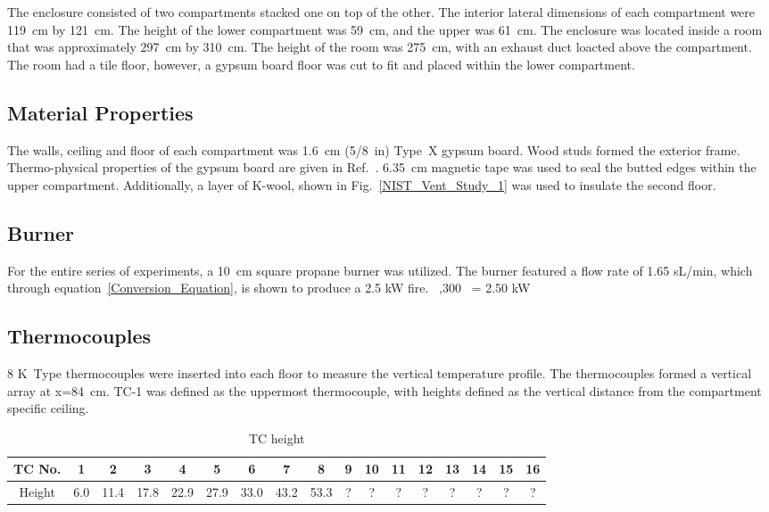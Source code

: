The enclosure consisted of two compartments stacked one on top of the other. The interior lateral dimensions of each compartment were 119~cm by 121~cm. The height of the lower compartment was 59~cm, and the upper was 61~cm. The enclosure was located inside a room that was approximately 297~cm by 310~cm. The height of the room was 275~cm, with an exhaust duct loacted above the compartment. The room had a tile floor, however, a gypsum board floor was cut to fit and placed within the lower compartment. 

\subsection{Material Properties}

The walls, ceiling and floor of each compartment was 1.6~cm (5/8~in) Type~X gypsum board. Wood studs formed the exterior frame. Thermo-physical properties of the gypsum board are given in Ref.~\cite{Manzello:SiF08}. 6.35~cm magnetic tape was used to seal the butted edges within the upper compartment. Additionally, a  layer of K-wool, shown in Fig.~\ref{NIST_Vent_Study_1} was used to insulate the second floor.

\subsection{Burner}

For the entire series of experiments, a 10~cm square propane burner was utilized. The burner featured a flow rate of 1.65 sL/min, which through equation~\ref{Conversion_Equation}, is shown to produce a 2.5 kW fire.
  \times {}  \times {}   \,  ,300 \,  = 2.50 \; {\rm kW}
\label{Conversion_Equation}
\ee

\subsection{Thermocouples}
8 K~Type thermocouples were inserted into each floor to measure the vertical temperature profile. The thermocouples formed a vertical array at x=84~cm. TC-1 was defined as the uppermost thermocouple, with heights defined as the vertical distance from the compartment specific ceiling.

\begin{table}[h!]
\caption{TC height}
\begin{center}
\begin{tabular}{|c|c|c|c|c|c|c|c|c|c|c|c|c|c|c|c|c|}
\hline
TC No.& 1& 2& 3 & 4& 5& 6& 7& 8& 9&10&11&12&13&14&15&16\\ \hline
Height& 6.0& 11.4& 17.8& 22.9& 27.9& 33.0& 43.2& 53.3& ?& ?& ?& ?& ?& ?&?&?\\ \hline
\end{tabular}
\end{center}
\label{Tab.TC}
\end{table}

